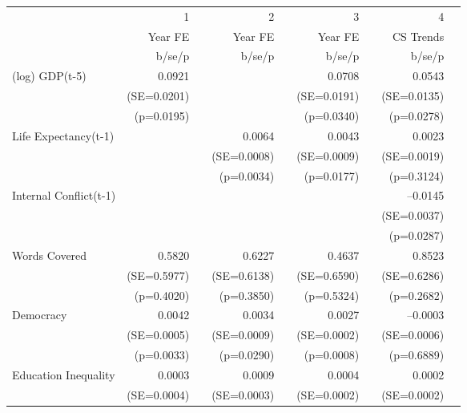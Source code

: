 \begin{tabular} {l* {4}{r @{} l}}
\hline
            &           1&   &           2&   &           3&   &           4&   \\
            &     Year FE&   &     Year FE&   &     Year FE&   &   CS Trends&   \\
            &      b/se/p&   &      b/se/p&   &      b/se/p&   &      b/se/p&   \\
\hline
(log) GDP(t-5)&      0.0921& &            &   &      0.0708& &      0.0543& \\
            &    (SE=0.0201)&   &            &   &    (SE=0.0191)&   &    (SE=0.0135)&   \\
            &    (p=0.0195)&   &            &   &    (p=0.0340)&   &    (p=0.0278)&   \\
Life Expectancy(t-1) &            &   &      0.0064&&      0.0043& &      0.0023&   \\
            &            &   &    (SE=0.0008)&   &    (SE=0.0009)&   &    (SE=0.0019)&   \\
            &            &   &    (p=0.0034)&   &    (p=0.0177)&   &    (p=0.3124)&   \\
Internal Conflict(t-1)&            &   &            &   &            &   &    --0.0145& \\
            &            &   &            &   &            &   &    (SE=0.0037)&   \\
            &            &   &            &   &            &   &    (p=0.0287)&   \\
Words Covered&      0.5820&   &      0.6227&   &      0.4637&   &      0.8523&   \\
            &    (SE=0.5977)&   &    (SE=0.6138)&   &    (SE=0.6590)&   &    (SE=0.6286)&   \\
            &    (p=0.4020)&   &    (p=0.3850)&   &    (p=0.5324)&   &    (p=0.2682)&   \\
Democracy   &      0.0042&&      0.0034& &      0.0027&&    --0.0003&   \\
            &    (SE=0.0005)&   &    (SE=0.0009)&   &    (SE=0.0002)&   &    (SE=0.0006)&   \\
            &    (p=0.0033)&   &    (p=0.0290)&   &    (p=0.0008)&   &    (p=0.6889)&   \\
Education Inequality&      0.0003&   &      0.0009&  &      0.0004&  &      0.0002&   \\
            &    (SE=0.0004)&   &    (SE=0.0003)&   &    (SE=0.0002)&   &    (SE=0.0002)&   \\

\end{tabular}
